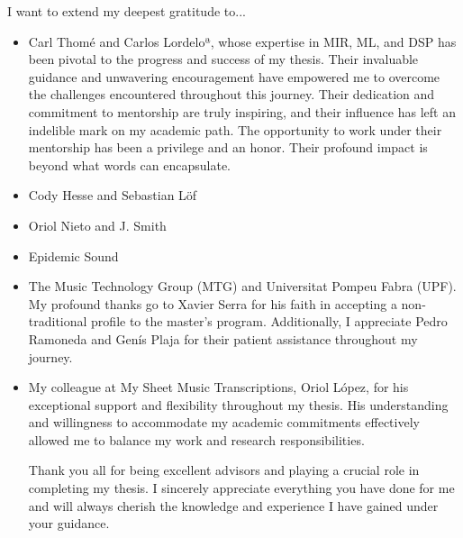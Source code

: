 

\begin{acknowledgement}

I want to extend my deepest gratitude to...

\begin{itemize}
\item Carl Thomé and Carlos Lordeloª, whose expertise in MIR, ML, and DSP has been pivotal to the progress and success of my thesis. Their invaluable guidance and unwavering encouragement have empowered me to overcome the challenges encountered throughout this journey. Their dedication and commitment to mentorship are truly inspiring, and their influence has left an indelible mark on my academic path. The opportunity to work under their mentorship has been a privilege and an honor. Their profound impact is beyond what words can encapsulate.

\vspace*{3mm}
\item Cody Hesse and Sebastian Löf

\vspace*{3mm}
\item Oriol Nieto and J. Smith

\vspace*{3mm}
\item Epidemic Sound

\vspace*{3mm}
\item The Music Technology Group (MTG) and Universitat Pompeu Fabra (UPF). My profound thanks go to Xavier Serra for his faith in accepting a non-traditional profile to the master's program. Additionally, I appreciate Pedro Ramoneda and Genís Plaja for their patient assistance throughout my journey.

\vspace*{3mm}
\item My colleague at My Sheet Music Transcriptions, Oriol López, for his exceptional support and flexibility throughout my thesis. His understanding and willingness to accommodate my academic commitments effectively allowed me to balance my work and research responsibilities.

\vspace*{3mm}
Thank you all for being excellent advisors and playing a crucial role in completing my thesis. I sincerely appreciate everything you have done for me and will always cherish the knowledge and experience I have gained under your guidance.

\vspace*{3mm}
\end{itemize}

\newpage
\end{acknowledgement}